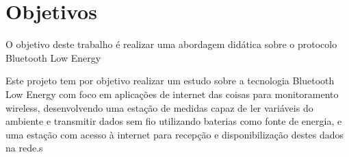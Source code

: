 \section{Objetivos}

O objetivo deste trabalho é realizar uma abordagem didática sobre o protocolo Bluetooth Low Energy


%
Este projeto tem por objetivo realizar um estudo sobre a tecnologia Bluetooth
Low Energy com foco em aplicações de internet das coisas para monitoramento
wireless, desenvolvendo uma estação de medidas capaz de ler variáveis do
ambiente e transmitir dados sem fio utilizando baterias como fonte de energia,
e uma estação com acesso à internet para recepção e disponibilização destes
dados na rede.s
